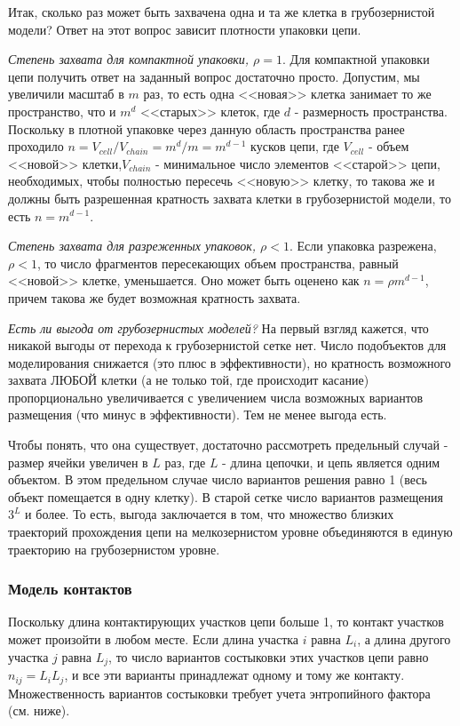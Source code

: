 \documentclass[tikz,a4paper]{scrartcl} %
\begin{document}
Итак, сколько раз может быть захвачена одна и та же клетка в грубозернистой модели?  Ответ на этот вопрос зависит плотности упаковки цепи. 

\textit{Степень захвата для компактной упаковки, $\rho = 1$}. Для компактной упаковки цепи получить ответ на заданный вопрос достаточно просто. Допустим, мы увеличили масштаб в $m$ раз, то есть одна <<новая>> клетка занимает то же пространство, что и $m^d$ <<старых>> клеток, где $d$ - размерность пространства. Поскольку в плотной упаковке через данную область пространства ранее проходило $n = V_{cell}/V_{chain} = m^d/m = m^{d-1}$ кусков цепи, где $V_{cell}$ - объем <<новой>> клетки,$V_{chain}$ - минимальное число элементов <<старой>> цепи, необходимых, чтобы полностью пересечь <<новую>> клетку, то такова же и должны быть разрешенная кратность захвата клетки в грубозернистой модели, то есть $n = m^{d-1}$.

\textit{Степень захвата для разреженных упаковок, $\rho < 1$}. Если упаковка разрежена, $\rho < 1$, то число фрагментов пересекающих объем пространства, равный <<новой>> клетке, уменьшается. Оно может быть оценено как $n = \rho m^{d-1}$, причем такова же будет возможная кратность захвата.

\textit{Есть ли выгода от грубозернистых моделей?} На первый взгляд кажется, что никакой выгоды от перехода к грубозернистой сетке нет. Число подобъектов для моделирования снижается (это плюс в эффективности), но кратность возможного захвата ЛЮБОЙ клетки (а не только той, где происходит касание) пропорционально увеличивается с увеличением числа возможных вариантов размещения (что минус в эффективности). Тем не менее выгода есть. 

Чтобы понять, что она существует, достаточно рассмотреть предельный случай - размер ячейки увеличен в $L$ раз, где $L$ - длина цепочки, и цепь является одним объектом. В этом предельном случае число вариантов решения равно 1 (весь объект помещается в одну клетку). В старой сетке число вариантов размещения $3^L$ и более. То есть, выгода заключается в том, что множество близких траекторий прохождения цепи на мелкозернистом уровне объединяются в единую траекторию на грубозернистом уровне.

\subsubsection*{Модель контактов}
Поскольку длина контактирующих участков цепи больше 1, то контакт участков может произойти в любом месте. Если длина участка $i$ равна $L_i$, а длина другого участка $j$ равна $L_j$, то число вариантов состыковки этих участков цепи равно $n_{ij} = L_i L_j$, и все эти варианты принадлежат одному и тому же контакту. Множественность вариантов состыковки требует учета энтропийного фактора (см. ниже).
\end{document}
